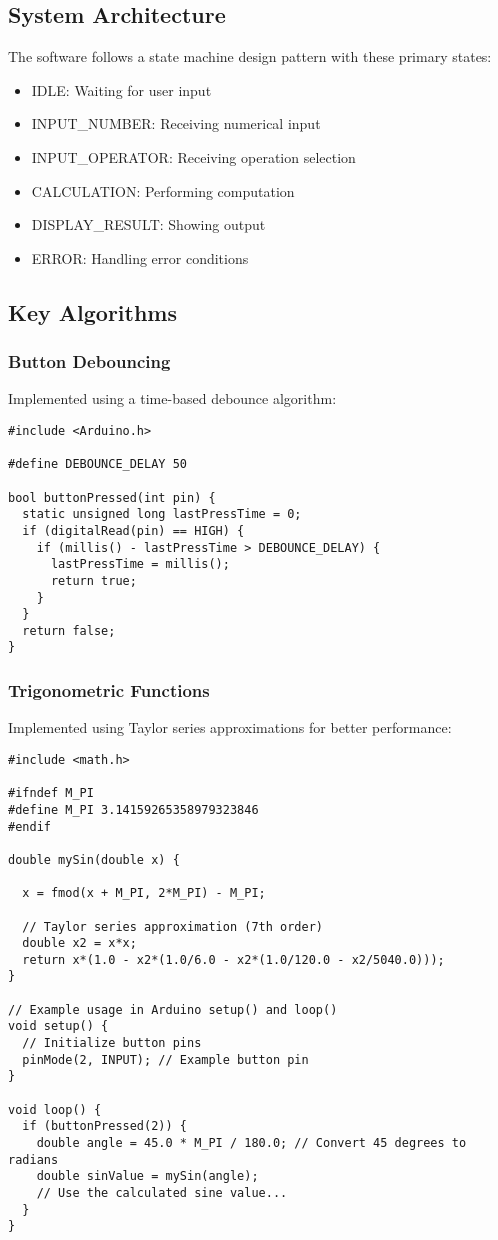 \documentclass[journal]{IEEEtran}
\begin{document}
\subsection{System Architecture}
The software follows a state machine design pattern with these primary states:
\begin{itemize}
    \item IDLE: Waiting for user input
    \item INPUT\_NUMBER: Receiving numerical input
    \item INPUT\_OPERATOR: Receiving operation selection
    \item CALCULATION: Performing computation
    \item DISPLAY\_RESULT: Showing output
    \item ERROR: Handling error conditions
\end{itemize}

\subsection{Key Algorithms}
\subsubsection{Button Debouncing}
Implemented using a time-based debounce algorithm:
\begin{lstlisting}
#include <Arduino.h>

#define DEBOUNCE_DELAY 50

bool buttonPressed(int pin) {
  static unsigned long lastPressTime = 0;
  if (digitalRead(pin) == HIGH) {
    if (millis() - lastPressTime > DEBOUNCE_DELAY) {
      lastPressTime = millis();
      return true;
    }
  }
  return false;
}
\end{lstlisting}

\subsubsection{Trigonometric Functions}
Implemented using Taylor series approximations for better performance:
\begin{lstlisting}
#include <math.h>

#ifndef M_PI
#define M_PI 3.14159265358979323846
#endif

double mySin(double x) {
  
  x = fmod(x + M_PI, 2*M_PI) - M_PI;
  
  // Taylor series approximation (7th order)
  double x2 = x*x;
  return x*(1.0 - x2*(1.0/6.0 - x2*(1.0/120.0 - x2/5040.0)));
}

// Example usage in Arduino setup() and loop()
void setup() {
  // Initialize button pins
  pinMode(2, INPUT); // Example button pin
}

void loop() {
  if (buttonPressed(2)) {
    double angle = 45.0 * M_PI / 180.0; // Convert 45 degrees to radians
    double sinValue = mySin(angle);
    // Use the calculated sine value...
  }
}
\end{lstlisting}
\end{document}
